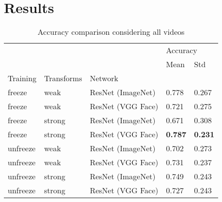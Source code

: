 
\section{Results}

\begin{table}[h!tp]
\centering
\caption{Accuracy comparison considering all videos}
\label{tab:accuracy_all}
\begin{tabular}{lllll}
\toprule
         &        &          & \multicolumn{2}{l}{Accuracy} \\
         &        &          &     Mean &    Std \\
Training & Transforms & Network &          &        \\
\midrule
freeze   & weak   & ResNet (ImageNet) &    0.778 &  0.267 \\
freeze   & weak   & ResNet (VGG Face) &    0.721 &  0.275 \\
freeze   & strong & ResNet (ImageNet) &    0.671 &  0.308 \\
freeze   & strong & ResNet (VGG Face) &    \textbf{0.787} & \textbf{ 0.231} \\
unfreeze & weak   & ResNet (ImageNet) &    0.702 &  0.273 \\
unfreeze & weak   & ResNet (VGG Face) &    0.731 &  0.237 \\
unfreeze & strong & ResNet (ImageNet) &    0.749 &  0.243 \\
unfreeze & strong & ResNet (VGG Face) &    0.727 &  0.243 \\
\bottomrule
\end{tabular}
\end{table}

